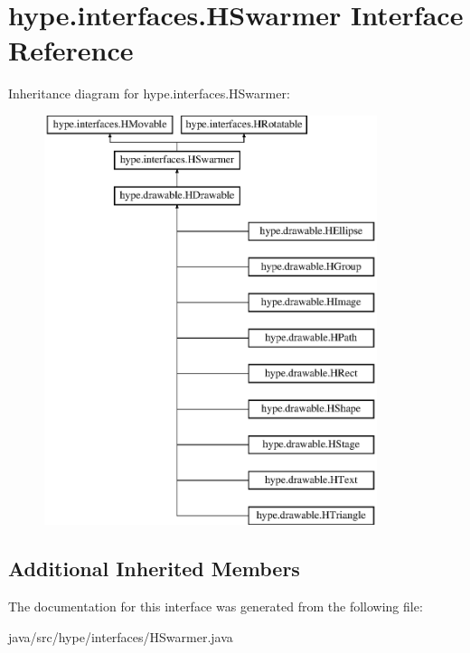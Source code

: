 \hypertarget{interfacehype_1_1interfaces_1_1_h_swarmer}{\section{hype.\-interfaces.\-H\-Swarmer Interface Reference}
\label{interfacehype_1_1interfaces_1_1_h_swarmer}
}
Inheritance diagram for hype.\-interfaces.\-H\-Swarmer\-:\begin{figure}[H]
\begin{center}
\leavevmode
\includegraphics[height=12.000000cm]{interfacehype_1_1interfaces_1_1_h_swarmer}
\end{center}
\end{figure}
\subsection*{Additional Inherited Members}


The documentation for this interface was generated from the following file\-:\begin{DoxyCompactItemize}
\item 
java/src/hype/interfaces/H\-Swarmer.\-java\end{DoxyCompactItemize}
